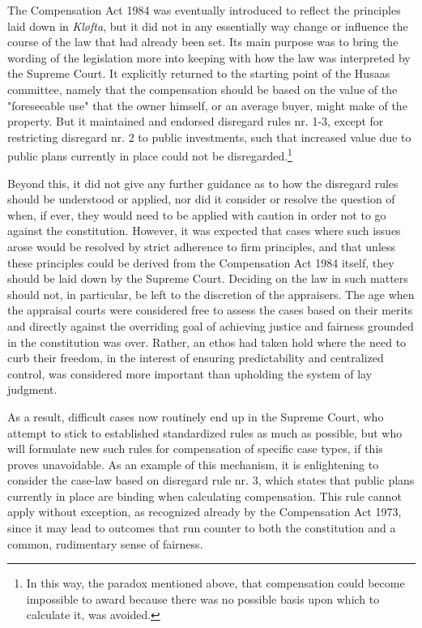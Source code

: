 \documentclass[10pt]{article} %
\begin{document}
The Compensation Act 1984 was eventually introduced to reflect the principles laid down in \emph{Kløfta}, but it did not in any essentially way change or influence the course of the law that had already been set. Its main purpose was to bring the wording of the legislation more into keeping with how the law was interpreted by the Supreme Court. It explicitly returned to the starting point of the Husaas committee, namely that the compensation should be based on the value of the "foreseeable use" that the owner himself, or an average buyer, might make of the property. But it maintained and endorsed disregard rules nr. 1-3, except for restricting disregard nr. 2 to public investments, such that increased value due to public plans currently in place could not be disregarded.\footnote{In this way, the paradox mentioned above, that compensation could become impossible to award because there was no possible basis upon which to calculate it, was avoided.}

Beyond this, it did not give any further guidance as to how the disregard rules should be understood or applied, nor did it consider or resolve the question of when, if ever, they would need to be applied with caution in order not to go against the constitution. However, it was expected that cases where such issues arose would be resolved by strict adherence to firm principles, and that unless these principles could be derived from the Compensation Act 1984 itself, they should be laid down by the Supreme Court. Deciding on the law in such matters should not, in particular, be left to the discretion of the appraisers. The age when the appraisal courts were considered free to assess the cases based on their merits and directly against the overriding goal of achieving justice and fairness grounded in the constitution was over. Rather, an ethos had taken hold where the need to curb their freedom, in the interest of ensuring predictability and centralized control, was considered more important than upholding the system of lay judgment. 

As a result, difficult cases now routinely end up in the Supreme Court, who attempt to stick to established standardized rules as much as possible, but who will formulate new such rules for compensation of specific case types, if this proves unavoidable. As an example of this mechanism, it is enlightening to consider the case-law based on disregard rule nr. 3, which states that public plans currently in place are binding when calculating compensation. This rule cannot apply without exception, as recognized already by the Compensation Act 1973, since it may lead to outcomes that run counter to both the constitution and a common, rudimentary sense of fairness. 
\end{document}
